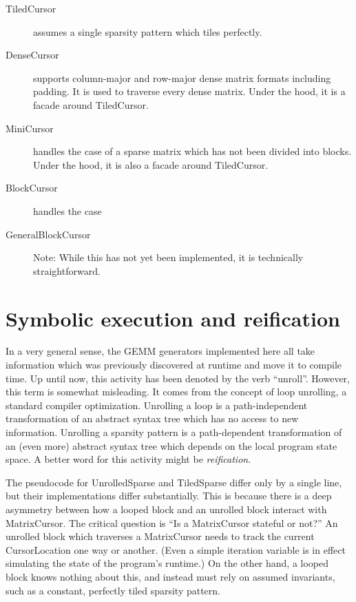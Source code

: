     \begin{description}
        \item[TiledCursor] assumes a single sparsity pattern which tiles perfectly. 

        \item[DenseCursor] supports column-major and row-major dense matrix formats including padding. It is used to traverse every dense matrix. Under the hood, it is a facade around TiledCursor.

        \item[MiniCursor] handles the case of a sparse matrix which has not been divided into blocks. Under the hood, it is also a facade around TiledCursor.

        \item[BlockCursor] handles the case 

        \item[GeneralBlockCursor] Note: While this has not yet been implemented, it is technically straightforward.
    \end{description}


\section{Symbolic execution and reification}
\label{section:theory}


In a very general sense, the GEMM generators implemented here all take information which was previously discovered at runtime and move it to compile time. Up until now, this activity has been denoted by the verb ``unroll''. However, this term is somewhat misleading. It comes from the concept of loop unrolling, a standard compiler optimization. Unrolling a loop is a path-independent transformation of an abstract syntax tree which has no access to new information. Unrolling a sparsity pattern is a path-dependent transformation of an (even more) abstract syntax tree which depends on the local program state space. A better word for this activity might be \emph{reification}. 

The pseudocode for UnrolledSparse and TiledSparse differ only by a single line, but their implementations differ substantially. This is because there is a deep asymmetry between how a looped block and an unrolled block interact with MatrixCursor. The critical question is ``Is a MatrixCursor stateful or not?'' An unrolled block which traverses a MatrixCursor needs to track the current CursorLocation one way or another. (Even a simple iteration variable is in effect simulating the state of the program's runtime.) On the other hand, a looped block knows nothing about this, and instead must rely on assumed invariants, such as a constant, perfectly tiled sparsity pattern.

